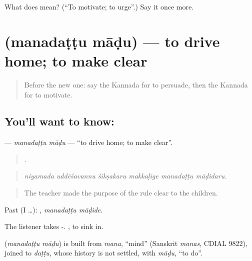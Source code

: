 \begin{tcolorbox}[breakable,colback=teal!4,colframe=teal!35!black,title={Before you move on}]
What does  mean? (\textquotedblleft{}To motivate; to urge\textquotedblright{}.) Say it once more.
\end{tcolorbox}
\section[\texorpdfstring{\kn{ಮನದಟ್ಟು} \kn{ಮಾಡು} (manadaṭṭu māḍu)}{ಮನದಟ್ಟು ಮಾಡು (manadaṭṭu māḍu)}]{  (manadaṭṭu māḍu) — to drive home; to make clear}

\label{lesson:KA-C380-manadattu-madu}



\begin{quote}
Before the new one: say the Kannada for to persuade, then the Kannada for to motivate.
\end{quote}

\subsection*{You'll want to know:  }
\textbf{ } — \emph{manadaṭṭu māḍu} — \textquotedblleft{}to drive home; to make clear\textquotedblright{}.

\begin{quote}
     .
\end{quote}

\begin{quote}
\emph{niyamada uddēśavannu śikṣakaru makkaḷige manadaṭṭu māḍidaru.}
\end{quote}

\begin{quote}
The teacher made the purpose of the rule clear to the children.
\end{quote}

Past (I …):  , \emph{manadaṭṭu māḍide}.

The listener takes -. , to sink in.

\begin{cousinweb}
\textbf{ } (\emph{manadaṭṭu māḍu}) is built from \emph{mana}, \textquotedblleft{}mind\textquotedblright{} (Sanskrit \emph{manas}, CDIAL 9822), joined to \emph{daṭṭu}, whose history is not settled, with \emph{māḍu}, \textquotedblleft{}to do\textquotedblright{}.
\end{cousinweb}

